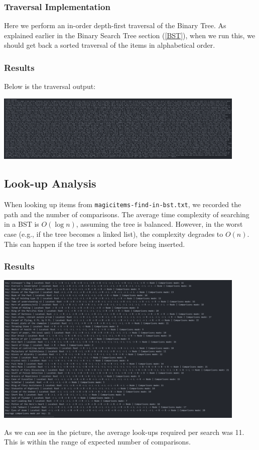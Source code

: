 \documentclass[12pt, letterpaper]{article}
\begin{document}
\subsubsection{Traversal Implementation}
\begin{center}
   
\end{center}
Here we perform an in-order depth-first traversal of the Binary Tree.
As explained earlier in the Binary Search Tree section (\ref{BST}), when we run this, we should get back a sorted traversal of the items in alphabetical order.
\subsubsection{Results}
Below is the traversal output:
\begin{center}
   \includegraphics[width=120mm, scale=0.5]{Images/BinTree_Traversal.png}
\end{center}

\subsection{Look-up Analysis} \label{Search}
When looking up items from \texttt{magicitems-find-in-bst.txt}, we recorded the path and the number of comparisons.
The average time complexity of searching in a BST is $O(\log n)$, assuming the tree is balanced.
However, in the worst case (e.g., if the tree becomes a linked list), the complexity degrades to $O(n)$.
This can happen if the tree is sorted before being inserted.
\subsubsection{Results}
\begin{center}
   \includegraphics[width=120mm, scale=0.5]{Images/BinTree_Searches.png}
\end{center}
As we can see in the picture, the average look-ups required per search was 11.
This is within the range of expected number of comparisons.
\end{document}
